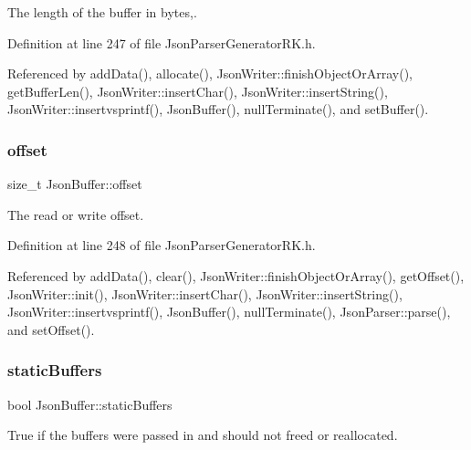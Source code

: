 The length of the buffer in bytes,. 



Definition at line 247 of file Json\+Parser\+Generator\+R\+K.\+h.



Referenced by add\+Data(), allocate(), Json\+Writer\+::finish\+Object\+Or\+Array(), get\+Buffer\+Len(), Json\+Writer\+::insert\+Char(), Json\+Writer\+::insert\+String(), Json\+Writer\+::insertvsprintf(), Json\+Buffer(), null\+Terminate(), and set\+Buffer().

\mbox{\label{class_json_buffer_aeb1ab3291108f351834f2e8c6784538c}} 
\subsubsection{\texorpdfstring{offset}{offset}}
{\footnotesize\ttfamily size\+\_\+t Json\+Buffer\+::offset\hspace{0.3cm}{\ttfamily [protected]}}



The read or write offset. 



Definition at line 248 of file Json\+Parser\+Generator\+R\+K.\+h.



Referenced by add\+Data(), clear(), Json\+Writer\+::finish\+Object\+Or\+Array(), get\+Offset(), Json\+Writer\+::init(), Json\+Writer\+::insert\+Char(), Json\+Writer\+::insert\+String(), Json\+Writer\+::insertvsprintf(), Json\+Buffer(), null\+Terminate(), Json\+Parser\+::parse(), and set\+Offset().

\mbox{\label{class_json_buffer_a729845e25c624d1dcb1da9712afbcdf7}} 
\subsubsection{\texorpdfstring{static\+Buffers}{staticBuffers}}
{\footnotesize\ttfamily bool Json\+Buffer\+::static\+Buffers\hspace{0.3cm}{\ttfamily [protected]}}



True if the buffers were passed in and should not freed or reallocated. 



